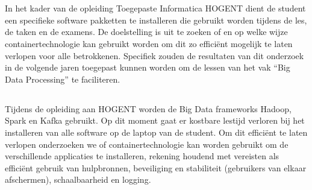 
\chapter{}%
\label{ch:inleiding}

In het kader van de opleiding Toegepaste Informatica HOGENT dient de student een specifieke software pakketten te installeren die gebruikt worden tijdens de les, de taken en de examens.
De doelstelling is uit te zoeken of en op welke wijze containertechnologie kan gebruikt worden om dit zo efficiënt mogelijk te laten verlopen voor alle betrokkenen. Specifiek zouden de resultaten van dit onderzoek in de volgende jaren toegepast kunnen worden om de lessen van het vak ``Big Data Processing'' te faciliteren.

\section{}%
\label{sec:probleemstelling}
Tijdens de opleiding aan HOGENT worden de Big Data frameworks Hadoop, Spark en Kafka gebruikt. Op dit moment gaat er kostbare lestijd verloren bij het installeren van alle software op de laptop van de student. Om dit efficiënt te laten verlopen onderzoeken we of containertechnologie kan worden gebruikt om de verschillende applicaties te installeren, rekening houdend met vereisten als efficiënt gebruik van hulpbronnen, beveiliging en stabiliteit (gebruikers van elkaar afschermen), schaalbaarheid en logging.

